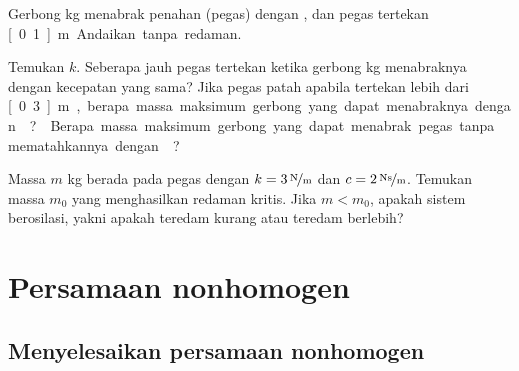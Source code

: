 \begin{exercise}
\pagebreak[2]
Gerbong \unit[5000]{kg} menabrak penahan (pegas) dengan , dan pegas tertekan \unit[0.1]{m}. Andaikan tanpa redaman.
\begin{tasks}
\task Temukan $k$.
\task Seberapa jauh pegas tertekan ketika gerbong \unit[10000]{kg} menabraknya dengan kecepatan yang sama?
\task Jika pegas patah apabila tertekan lebih dari \unit[0.3]{m}, berapa massa maksimum gerbong yang dapat menabraknya dengan ?
\task Berapa massa maksimum gerbong yang dapat menabrak pegas tanpa mematahkannya dengan ?
\end{tasks}
\end{exercise}

\begin{exercise}
Massa $m$ \unit{kg} berada pada pegas dengan $k=\unitfrac[3]{N}{m}$ dan $c=\unitfrac[2]{Ns}{m}$. Temukan massa $m_0$ yang menghasilkan redaman kritis. Jika $m < m_0$, apakah sistem berosilasi, yakni apakah teredam kurang atau teredam berlebih?
\end{exercise}


\sectionnewpage
\section{Persamaan nonhomogen}
\label{sec:nonhom}



\subsection{Menyelesaikan persamaan nonhomogen}

